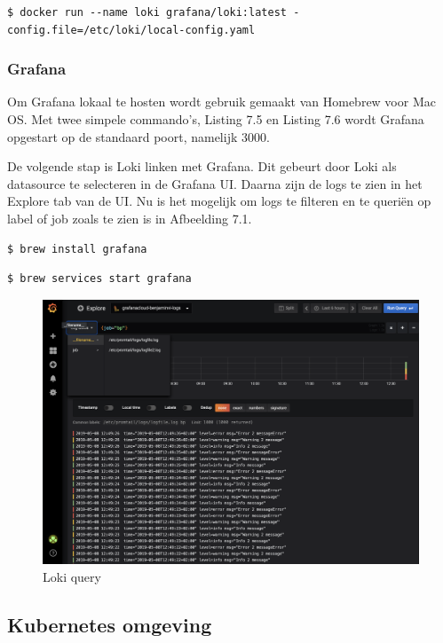\begin{lstlisting}[caption=Aanmaken van Loki container]
$ docker run --name loki grafana/loki:latest -config.file=/etc/loki/local-config.yaml
\end{lstlisting}

\subsubsection{Grafana}

Om Grafana lokaal te hosten wordt gebruik gemaakt van Homebrew voor Mac OS. Met twee simpele commando's, Listing 7.5 en Listing 7.6 wordt Grafana opgestart op de standaard poort, namelijk 3000.

De volgende stap is Loki linken met Grafana. Dit gebeurt door Loki als datasource te selecteren in de Grafana UI. Daarna zijn de logs te zien in het Explore tab van de UI. Nu is het mogelijk om logs te filteren en te queriën op label of job zoals te zien is in Afbeelding 7.1.

\begin{lstlisting}[language=bash, caption=install grafana]
$ brew install grafana
\end{lstlisting}
\begin{lstlisting}[language=bash, caption=start grafana]
$ brew services start grafana
\end{lstlisting}

\begin{figure}[ht]
    \centering
    \includegraphics[scale=0.35]{img/loki_query}
    \caption[Loki query]{Loki query}
\end{figure}


\subsection{Kubernetes omgeving}

